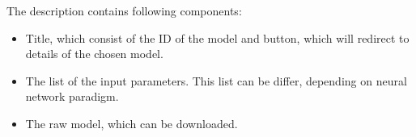 \begin{itemize}
The description contains following components:
\begin{itemize}
\item Title, which consist of the ID of the model and button, which will redirect to details of the chosen model.
\item The list of the input parameters. This list can be differ, depending on neural network paradigm. 
\item The raw model, which can be downloaded. 
\end{itemize}

\end{itemize}
